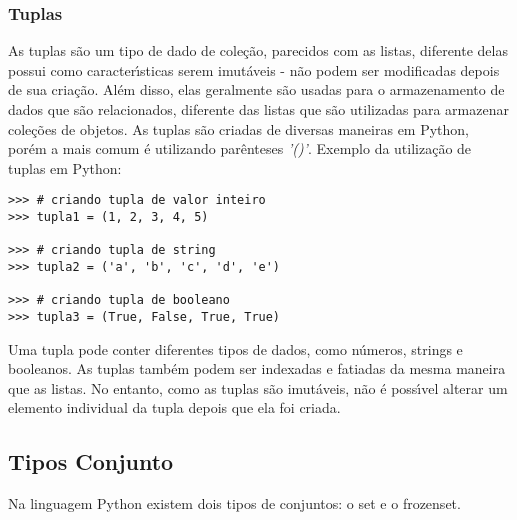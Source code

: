 \subsubsection{Tuplas}
As tuplas s\~{a}o um tipo de dado de cole\c{c}\~{a}o, parecidos com as listas, diferente delas possui como caracter\'{\i}sticas serem imut\'{a}veis - n\~{a}o podem ser modificadas depois de sua cria\c{c}\~{a}o. Al\'{e}m disso, elas geralmente s\~{a}o usadas para o armazenamento de dados que s\~{a}o relacionados, diferente das listas que s\~{a}o utilizadas para armazenar cole\c{c}\~{o}es de objetos. As tuplas s\~{a}o criadas de diversas maneiras em Python, por\'{e}m a mais comum \'{e} utilizando par\^{e}nteses \textsl{'()'}. Exemplo da utiliza\c{c}\~{a}o de tuplas em Python: 

\begin{lstlisting}
>>> # criando tupla de valor inteiro
>>> tupla1 = (1, 2, 3, 4, 5)

>>> # criando tupla de string
>>> tupla2 = ('a', 'b', 'c', 'd', 'e')

>>> # criando tupla de booleano
>>> tupla3 = (True, False, True, True)
\end{lstlisting}	

Uma tupla pode conter diferentes tipos de dados, como n\'{u}meros, strings e booleanos. As tuplas tamb\'{e}m podem ser indexadas e fatiadas da mesma maneira que as listas. No entanto, como as tuplas s\~{a}o imut\'{a}veis, n\~{a}o \'{e} poss\'{\i}vel alterar um elemento individual da tupla depois que ela foi criada.	
\subsection{Tipos Conjunto}
Na linguagem Python existem dois tipos de conjuntos: o set e o frozenset.
